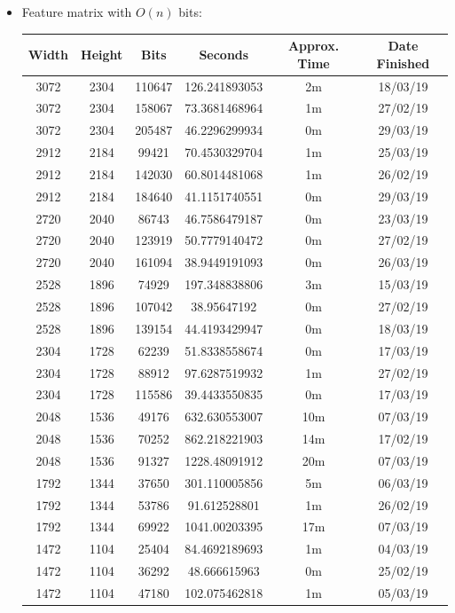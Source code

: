 \documentclass[11pt,a4paper]{report}
\begin{document}
\begin{itemize}
\newpage
\item Feature matrix with $O(n)$ bits:
  \begin{center}
  \begin{tabular}{ c c c | c c c }
  Width & Height & Bits & Seconds & Approx. Time & Date Finished \\ \hline
  3072 & 2304 & 110647 & 126.241893053 & 2m & 18/03/19 \\
  3072 & 2304 & 158067 & 73.3681468964 & 1m & 27/02/19 \\
  3072 & 2304 & 205487 & 46.2296299934 & 0m & 29/03/19 \\
  2912 & 2184 & 99421 & 70.4530329704 & 1m & 25/03/19 \\
  2912 & 2184 & 142030 & 60.8014481068 & 1m & 26/02/19 \\
  2912 & 2184 & 184640 & 41.1151740551 & 0m & 29/03/19 \\
  2720 & 2040 & 86743 & 46.7586479187 & 0m & 23/03/19 \\
  2720 & 2040 & 123919 & 50.7779140472 & 0m & 27/02/19 \\
  2720 & 2040 & 161094 & 38.9449191093 & 0m & 26/03/19 \\
  2528 & 1896 & 74929 & 197.348838806 & 3m & 15/03/19 \\
  2528 & 1896 & 107042 & 38.95647192 & 0m & 27/02/19 \\
  2528 & 1896 & 139154 & 44.4193429947 & 0m & 18/03/19 \\
  2304 & 1728 & 62239 & 51.8338558674 & 0m & 17/03/19 \\
  2304 & 1728 & 88912 & 97.6287519932 & 1m & 27/02/19 \\
  2304 & 1728 & 115586 & 39.4433550835 & 0m & 17/03/19 \\
  2048 & 1536 & 49176 & 632.630553007 & 10m & 07/03/19 \\
  2048 & 1536 & 70252 & 862.218221903 & 14m & 17/02/19 \\
  2048 & 1536 & 91327 & 1228.48091912 & 20m & 07/03/19 \\
  1792 & 1344 & 37650 & 301.110005856 & 5m & 06/03/19 \\
  1792 & 1344 & 53786 & 91.612528801 & 1m & 26/02/19 \\
  1792 & 1344 & 69922 & 1041.00203395 & 17m & 07/03/19 \\
  1472 & 1104 & 25404 & 84.4692189693 & 1m & 04/03/19 \\
  1472 & 1104 & 36292 & 48.666615963 & 0m & 25/02/19 \\
  1472 & 1104 & 47180 & 102.075462818 & 1m & 05/03/19 \\

\end{tabular}
\end{center}
\end{itemize}
\end{document}
